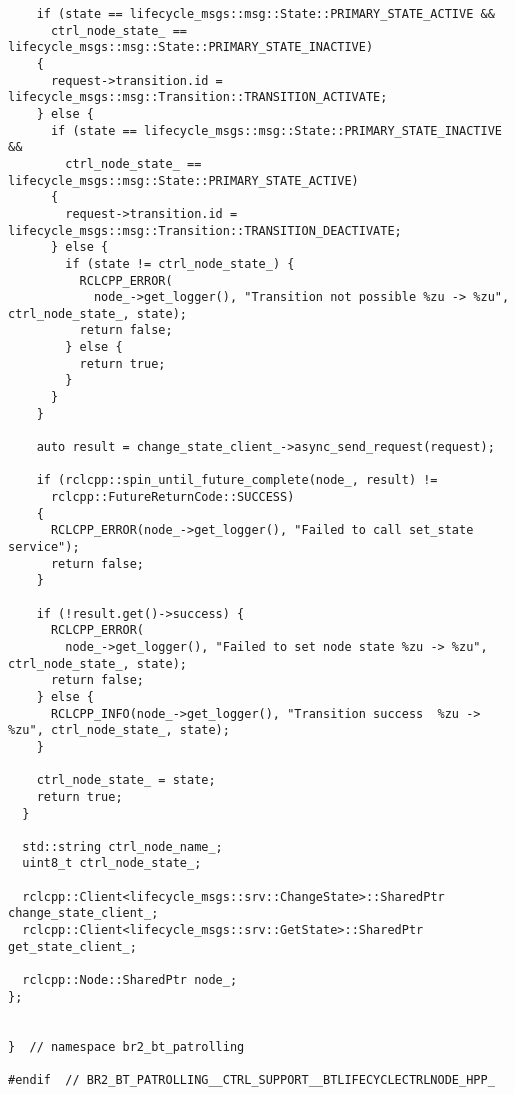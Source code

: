 \begin{tcolorbox}[sharp corners, colframe=gray!80, colback=LightGray, left=0pt, top=0pt, bottom=0pt, title=\texttt{br2\_bt\_patrolling/include/br2\_bt\_patrolling/ctrl\_support/BTLifecycleCtrlNode.hpp}]
\begin{verbatim}
    if (state == lifecycle_msgs::msg::State::PRIMARY_STATE_ACTIVE &&
      ctrl_node_state_ == lifecycle_msgs::msg::State::PRIMARY_STATE_INACTIVE)
    {
      request->transition.id = lifecycle_msgs::msg::Transition::TRANSITION_ACTIVATE;
    } else {
      if (state == lifecycle_msgs::msg::State::PRIMARY_STATE_INACTIVE &&
        ctrl_node_state_ == lifecycle_msgs::msg::State::PRIMARY_STATE_ACTIVE)
      {
        request->transition.id = lifecycle_msgs::msg::Transition::TRANSITION_DEACTIVATE;
      } else {
        if (state != ctrl_node_state_) {
          RCLCPP_ERROR(
            node_->get_logger(), "Transition not possible %zu -> %zu", ctrl_node_state_, state);
          return false;
        } else {
          return true;
        }
      }
    }

    auto result = change_state_client_->async_send_request(request);

    if (rclcpp::spin_until_future_complete(node_, result) !=
      rclcpp::FutureReturnCode::SUCCESS)
    {
      RCLCPP_ERROR(node_->get_logger(), "Failed to call set_state service");
      return false;
    }

    if (!result.get()->success) {
      RCLCPP_ERROR(
        node_->get_logger(), "Failed to set node state %zu -> %zu", ctrl_node_state_, state);
      return false;
    } else {
      RCLCPP_INFO(node_->get_logger(), "Transition success  %zu -> %zu", ctrl_node_state_, state);
    }

    ctrl_node_state_ = state;
    return true;
  }

  std::string ctrl_node_name_;
  uint8_t ctrl_node_state_;

  rclcpp::Client<lifecycle_msgs::srv::ChangeState>::SharedPtr change_state_client_;
  rclcpp::Client<lifecycle_msgs::srv::GetState>::SharedPtr get_state_client_;

  rclcpp::Node::SharedPtr node_;
};


}  // namespace br2_bt_patrolling

#endif  // BR2_BT_PATROLLING__CTRL_SUPPORT__BTLIFECYCLECTRLNODE_HPP_
    \end{verbatim}
    \end{tcolorbox}
  \normalsize

